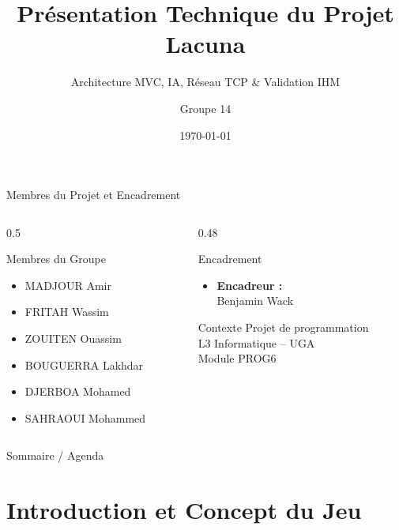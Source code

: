 \documentclass{beamer}
\title{Présentation Technique du Projet Lacuna}
\subtitle{Architecture MVC, IA, Réseau TCP \& Validation IHM}
\author{Groupe 14}
\date{\today}
\begin{document}
\begin{frame}
    \titlepage
\end{frame}

\begin{frame}{Membres du Projet et Encadrement}
    \begin{columns}[t]
        \begin{column}{0.5\textwidth}
            \begin{block}{Membres du Groupe}
                \begin{itemize}
                    \item MADJOUR Amir
                    \item FRITAH Wassim
                    \item ZOUITEN Ouassim
                    \item BOUGUERRA Lakhdar
                    \item DJERBOA Mohamed
                    \item SAHRAOUI Mohammed
                \end{itemize}
            \end{block}
        \end{column}
        \begin{column}{0.48\textwidth}
            \begin{block}{Encadrement}
                \begin{itemize}
                    \item \textbf{Encadreur :} \\ Benjamin Wack
                \end{itemize}
            \end{block}
            \vspace{0.2cm}
            \begin{block}{Contexte}
                Projet de programmation \\
                L3 Informatique -- UGA \\
                Module PROG6
            \end{block}
        \end{column}
    \end{columns}
\end{frame}

\begin{frame}{Sommaire / Agenda}
    \tableofcontents
\end{frame}

\section{Introduction et Concept du Jeu}
\end{document}
